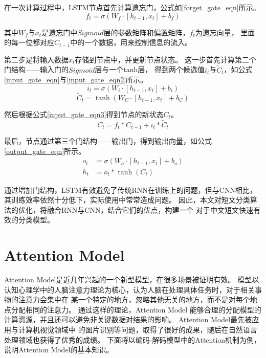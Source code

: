 在一次计算过程中，LSTM节点首先计算遗忘门，公式如\ref{forget_gate_eqn}所示。
\begin{equation}
    f_t=\sigma\left ( W_f \cdot [h_{t-1},x_t]+b_f \right )
    \label{forget_gate_eqn}
\end{equation}

其中$W_f$与$x_t$是遗忘门中$Sigmoid$层的参数矩阵和偏置矩阵，$f_t$为遗忘向量，
里面的每一位都对应$C_{t-1}$中的一个数据，用来控制信息的流入。

第二步是将输入数据$x_t$存储到节点中，并更新节点状态。
这一步首先计算第二个门结构——输入门的$Sigmoid$层与一个tanh层，
得到两个候选值$i_t$与$\tilde{C}_t$，如公式\ref{input_gate_eqn}与\ref{input_gate_eqn2}所示。
\begin{equation}
    i_t=\sigma\left ( W_i \cdot [h_{t-1},x_t]+b_i \right )
    \label{input_gate_eqn}
\end{equation}
\begin{equation}
    \tilde{C}_t=\tanh\left ( W_C \cdot [h_{t-1},x_t]+b_C \right )
    \label{input_gate_eqn2}
\end{equation}

然后根据公式\ref{input_gate_eqn3}得到节点的新状态$C_t$。
\begin{equation}
    C_t=f_t \ast C_{t-1} + i_t \ast \tilde{C}_t 
    \label{input_gate_eqn3}
\end{equation}

最后，节点通过第三个门结构——输出门，得到输出向量，如公式\ref{output_gate_eqn}所示。
\begin{equation}
    \begin{split}
        o_t&=\sigma\left ( W_o \cdot [h_{t-1},x_t]+b_o \right ) \\
        h_t &= o_t \ast \tanh\left ( C_t \right )
    \end{split}
    \label{output_gate_eqn}
\end{equation}

通过增加门结构，LSTM有效避免了传统RNN在训练上的问题，但与CNN相比，
其训练效率依然十分低下，实际使用中常常造成问题。
因此，本文对短文分类算法的优化，将融合RNN与CNN，结合它们的优点，构建一个
对于中文短文快速有效的分类模型。

\section{Attention Model}
Attention Model是近几年兴起的一个新型模型，在很多场景被证明有效。
模型以认知心理学中的人脑注意力理论为核心，认为人脑在处理具体任务时，对于相关事物的注意力会集中在
某一个特定的地方，忽略其他无关的地方，而不是对每个地点分配相同的注意力。
通过这样的理论，Attention Model
能够合理的分配模型的计算资源，并且还可以避免非关键数据对结果的影响。
Attention Model最先被应用与计算机视觉领域中
的图片识别等问题，取得了很好的成果，随后在自然语言处理领域也获得了优秀的成绩。
\iffalse
下面将以编码-解码模型中的Attention机制为例，
说明Attention Model的基本知识。

